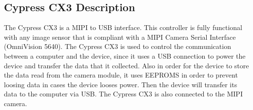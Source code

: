 \subsection{Cypress CX3 Description}
The Cypress CX3 is a MIPI to USB interface. This controller is fully functional with 
any image sensor that is compliant with a MIPI Camera Serial Interface (OmniVision 
5640). The Cypress CX3 is used to control the communication between a computer 
and the device, since it uses a USB connection to power the device and transfer the 
data that it collected. Also in order for the device to store the data read from the 
camera module, it uses EEPROMS in order to prevent loosing data in cases the 
device looses power. Then the device will transfer its data to the computer via USB. 
The Cypress CX3 is also connected to the MIPI camera.